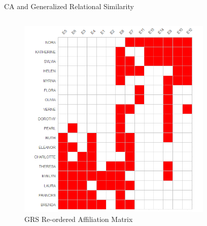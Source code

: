 \documentclass[
  ignorenonframetext,
]{beamer}
\begin{document}
\begin{frame}{CA and Generalized Relational Similarity}
\protect\hypertarget{ca-and-generalized-relational-similarity-3}{}
\begin{columns}[T]
\begin{column}{0.5\textwidth}
\begin{figure}

{\centering \includegraphics{Plots/grs-plot-reord.png}

}

\caption{GRS Re-ordered Affiliation Matrix}

\end{figure}
\end{column}

\begin{column}{0.5\textwidth}
\begin{figure}


\end{figure}
\end{column}
\end{columns}
\end{frame}
\end{document}
